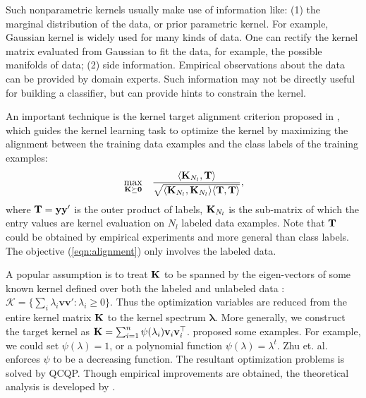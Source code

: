 Such nonparametric kernels usually make use of information like: (1) the marginal distribution of the data, or prior parametric kernel. For example, Gaussian kernel is widely used for many kinds of data. One can rectify the kernel matrix evaluated from Gaussian to fit the data, for example, the possible manifolds of data; (2) side information. Empirical observations about the data can be provided by domain experts. Such information may not be directly useful for building a classifier, but can provide hints to constrain the kernel. %

An important technique is the kernel target alignment criterion proposed in \cite{nips/CristianiniSEK01}, which guides the kernel learning task to optimize the kernel by maximizing the alignment between the training data examples and the class labels of the training examples:
\begin{eqnarray}
&\max_{\K\psd}& \frac{\langle \K_{N_l}, \T \rangle} {\sqrt{\langle \K_{N_l}, \K_{N_l} \rangle \langle \T, \T\rangle}}, \label{eqn:alignment}
\end{eqnarray}
where ${\bf T}=\mathbf{y}\mathbf{y}'$ is the outer product of labels, ${\mathbf K}_{N_l}$ is the sub-matrix of which the entry values are kernel evaluation on $N_l$ labeled data examples. Note that ${\bf T}$ could be obtained by empirical experiments and more general than class labels. The objective (\ref{eqn:alignment}) only involves the labeled data.

A popular assumption is to treat ${\mathbf K}$ to be spanned by the eigen-vectors of some known kernel defined over both the labeled and unlabeled data
\cite{nips/ChapelleWS02,nips/ZhuKGL04,kdd/HoiLC06,nips/ZhangA05,tit/JohnsonZ08}:
$\mathcal K=\{\sum_i\lambda_i\mathbf v\mathbf v':\lambda_i\geq 0\}$. Thus the optimization variables are reduced from the entire kernel matrix ${\mathbf K}$ to the kernel spectrum $\bm\lambda$. More generally, we construct the target kernel as ${\mathbf K}=\sum_{i=1}^n\psi(\lambda_i)\mathbf v_i\mathbf v_i^\top$. \cite{nips/ChapelleWS02}\cite{kdd/HoiLC06} proposed some examples. For example, we could set $\psi(\lambda)=1$, or a polynomial function $\psi(\lambda)=\lambda^t$. Zhu et. al. enforces $\psi$ to be a decreasing function\cite{nips/ZhuKGL04}. The resultant optimization problems is solved by QCQP. Though empirical improvements are obtained, the theoretical analysis is developed by \cite{nips/ZhangA05,tit/JohnsonZ08}.


